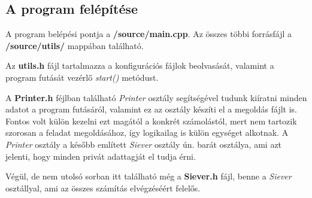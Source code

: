 \documentclass[twoside, a4paper, 12pt]{article}
\begin{document}
\subsection{A program felépítése} \label{program}

A program belépési pontja a \textbf{/source/main.cpp}. Az összes többi forrásfájl a \textbf{/source/utils/} mappában található. \par \bigskip
Az \textbf{utils.h} fájl tartalmazza a konfigurációs fájlok beolvasását, valamint a program futását vezérlő \textit{start()} metódust. \par \bigskip
A \textbf{Printer.h} féjlban található \textit{Printer} osztály segítségével tudunk kiíratni minden adatot a program futásáról, valamint ez az osztály készíti el a megoldás fájlt is. Fontos volt külön kezelni ezt magától a konkrét számolástól, mert nem tartozik szorosan a feladat megoldásához, így logikailag is külön egységet alkotnak. A \textit{Printer} osztály a később említett \textit{Siever} osztály ún. barát osztálya, ami azt jelenti, hogy minden privát adattagját el tudja érni. \par \bigskip
Végül, de nem utolsó sorban itt található még a \textbf{Siever.h} fájl, benne a \textit{Siever} osztállyal, ami az összes számítás elvégzéséért felelős. \par
\end{document}
